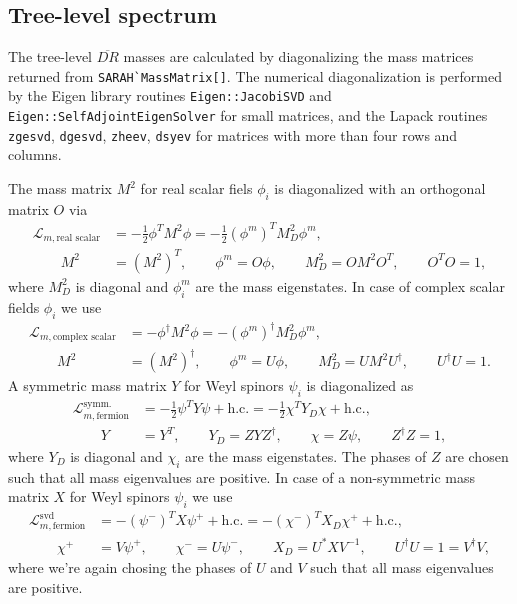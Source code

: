 \documentclass[final,3p,times,pdflatex]{elsarticle}
\newcommand{\code}[1]{\lstinline|#1|}  %
\newcommand{\Lagr}{\mathcal{L}}
\begin{document}
\subsection{Tree-level spectrum}
The tree-level $\overline{DR}$ masses are calculated by diagonalizing
the mass matrices returned from \code{SARAH`MassMatrix[]}.  The
numerical diagonalization is performed by the Eigen library routines
\code{Eigen::JacobiSVD} and \code{Eigen::SelfAdjointEigenSolver} for
small matrices, and the Lapack routines \code{zgesvd}, \code{dgesvd},
\code{zheev}, \code{dsyev} for matrices with more than four rows and
columns.

The mass matrix $M^2$ for real scalar fiels $\phi_i$ is diagonalized
with an orthogonal matrix $O$ via
%
\begin{align}
  \Lagr_{m,\text{real scalar}}
  &= - \frac{1}{2} \phi^T M^2 \phi
  = - \frac{1}{2} (\phi^m)^T M^2_D \phi^m, \\
  \qquad M^2 &= (M^2)^T ,
  \qquad \phi^m = O \phi ,
  \qquad M^2_D = O M^2 O^T ,
  \qquad O^T O = 1 ,
\end{align}
%
where $M^2_D$ is diagonal and $\phi^m_i$ are the mass eigenstates.  In
case of complex scalar fields $\phi_i$ we use
%
\begin{align}
  \Lagr_{m,\text{complex scalar}}
  &= - \phi^\dagger M^2 \phi
  = - (\phi^m)^\dagger M^2_D \phi^m, \\
  \qquad M^2 &= (M^2)^\dagger ,
  \qquad \phi^m = U \phi ,
  \qquad M^2_D = U M^2 U^\dagger ,
  \qquad U^\dagger U = 1 .
\end{align}
%
A symmetric mass matrix $Y$ for Weyl spinors $\psi_i$ is diagonalized
as
%
\begin{align}
  \Lagr_{m,\text{fermion}}^\text{symm.}
  &= - \frac{1}{2} \psi^T Y \psi + \text{h.c.}
  = - \frac{1}{2} \chi^T Y_D \chi + \text{h.c.}, \\
  \qquad Y &= Y^T ,
  \qquad Y_D = Z Y Z^\dagger ,
  \qquad \chi = Z \psi ,
  \qquad Z^\dagger Z = 1 ,
\end{align}
%
where $Y_D$ is diagonal and $\chi_i$ are the mass eigenstates.  The
phases of $Z$ are chosen such that all mass eigenvalues are positive.
In case of a non-symmetric mass matrix $X$ for Weyl spinors $\psi_i$
we use
%
\begin{align}
  \Lagr_{m,\text{fermion}}^\text{svd}
  &= - (\psi^-)^T X \psi^+ + \text{h.c.}
  = - (\chi^-)^T X_D \chi^+ + \text{h.c.}, \\
  \qquad \chi^+ &= V \psi^+ ,
  \qquad \chi^- = U \psi^- ,
  \qquad X_D = U^* X V^{-1} ,
  \qquad U^\dagger U = 1 = V^\dagger V ,
\end{align}
%
where we're again chosing the phases of $U$ and $V$ such that all mass
eigenvalues are positive.
\end{document}
